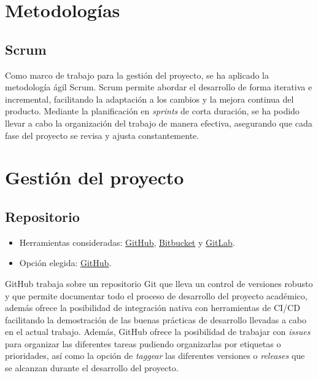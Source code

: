 
\section{Metodologías}\label{metodologias}

\subsection{Scrum}\label{scrum}
Como marco de trabajo para la gestión del proyecto, se ha aplicado la metodología ágil Scrum. Scrum permite abordar el desarrollo de forma iterativa e incremental, facilitando la adaptación a los cambios y la mejora continua del producto. Mediante la planificación en \emph{sprints} de corta duración, se ha podido llevar a cabo la organización del trabajo de manera efectiva, asegurando que cada fase del proyecto se revisa y ajusta constantemente.

\section{Gestión del proyecto}\label{gestion-del-proyecto}

\subsection{Repositorio}\label{repositorio}

\begin{itemize}
\tightlist
\item
  Herramientas consideradas: \href{https://github.com/}{GitHub},
  \href{https://bitbucket.org/}{Bitbucket} y
  \href{https://gitlab.com/}{GitLab}.
\item
  Opción elegida: \href{https://github.com/}{GitHub}.
\end{itemize}

GitHub trabaja sobre un repositorio Git que lleva un control de versiones robusto y que permite documentar todo el proceso de desarrollo del proyecto académico, además ofrece la posibilidad de integración nativa con herramientas de CI/CD~\cite{ci-cd} facilitando la demostración de las buenas prácticas de desarrollo llevadas a cabo en el actual trabajo.
Además, GitHub ofrece la posibilidad de trabajar con \emph{issues} para organizar las diferentes tareas pudiendo organizarlas por etiquetas o prioridades, así como la opción de \emph{taggear} las diferentes versiones o \emph{releases} que se alcanzan durante el desarrollo del proyecto.

